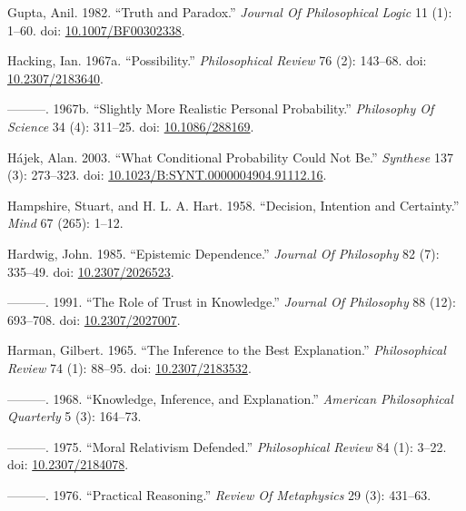 \documentclass[
  10pt,
  letterpaper,
  DIV=11,
  numbers=noendperiod,
  twoside]{scrartcl}
\newlength{\cslhangindent}
\newenvironment{CSLReferences}[2] %
 {\begin{list}{}{%
  \setlength{\itemindent}{0pt}
  \setlength{\leftmargin}{0pt}
  \setlength{\parsep}{0pt}
  \ifodd #1
   \setlength{\leftmargin}{\cslhangindent}
   \setlength{\itemindent}{-1\cslhangindent}
  \fi
  \setlength{\itemsep}{#2\baselineskip}}}
 {\end{list}}
\begin{document}
\begin{CSLReferences}{1}{0}
Gupta, Anil. 1982. {``Truth and Paradox.''} \emph{Journal Of
Philosophical Logic} 11 (1): 1--60. doi:
\href{https://doi.org/10.1007/BF00302338}{10.1007/BF00302338}.

Hacking, Ian. 1967a. {``Possibility.''} \emph{Philosophical Review} 76
(2): 143--68. doi:
\href{https://doi.org/10.2307/2183640}{10.2307/2183640}.

---------. 1967b. {``Slightly More Realistic Personal Probability.''}
\emph{Philosophy Of Science} 34 (4): 311--25. doi:
\href{https://doi.org/10.1086/288169}{10.1086/288169}.

Hájek, Alan. 2003. {``What Conditional Probability Could Not Be.''}
\emph{Synthese} 137 (3): 273--323. doi:
\href{https://doi.org/10.1023/B:SYNT.0000004904.91112.16}{10.1023/B:SYNT.0000004904.91112.16}.

Hampshire, Stuart, and H. L. A. Hart. 1958. {``Decision, Intention and
Certainty.''} \emph{Mind} 67 (265): 1--12.

Hardwig, John. 1985. {``Epistemic Dependence.''} \emph{Journal Of
Philosophy} 82 (7): 335--49. doi:
\href{https://doi.org/10.2307/2026523}{10.2307/2026523}.

---------. 1991. {``The Role of Trust in Knowledge.''} \emph{Journal Of
Philosophy} 88 (12): 693--708. doi:
\href{https://doi.org/10.2307/2027007}{10.2307/2027007}.

Harman, Gilbert. 1965. {``The Inference to the Best Explanation.''}
\emph{Philosophical Review} 74 (1): 88--95. doi:
\href{https://doi.org/10.2307/2183532}{10.2307/2183532}.

---------. 1968. {``Knowledge, Inference, and Explanation.''}
\emph{American Philosophical Quarterly} 5 (3): 164--73.

---------. 1975. {``Moral Relativism Defended.''} \emph{Philosophical
Review} 84 (1): 3--22. doi:
\href{https://doi.org/10.2307/2184078}{10.2307/2184078}.

---------. 1976. {``Practical Reasoning.''} \emph{Review Of Metaphysics}
29 (3): 431--63.


\end{CSLReferences}
\end{document}
